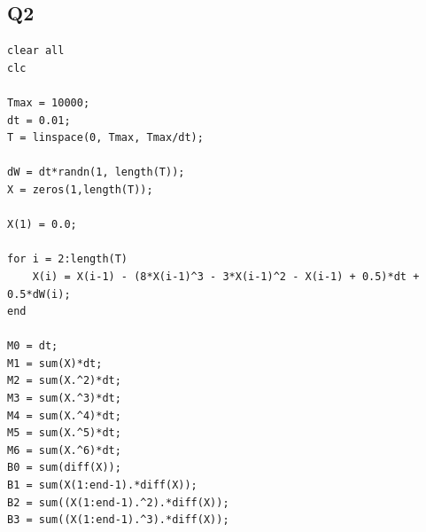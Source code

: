 \documentclass[11pt]{article} %
\begin{document}
\subsection{Q2}
\begin{verbatim}
clear all
clc

Tmax = 10000;
dt = 0.01;
T = linspace(0, Tmax, Tmax/dt);

dW = dt*randn(1, length(T));
X = zeros(1,length(T));

X(1) = 0.0;

for i = 2:length(T)
    X(i) = X(i-1) - (8*X(i-1)^3 - 3*X(i-1)^2 - X(i-1) + 0.5)*dt + 0.5*dW(i);
end

M0 = dt;
M1 = sum(X)*dt;
M2 = sum(X.^2)*dt;
M3 = sum(X.^3)*dt;
M4 = sum(X.^4)*dt;
M5 = sum(X.^5)*dt;
M6 = sum(X.^6)*dt;
B0 = sum(diff(X));
B1 = sum(X(1:end-1).*diff(X));
B2 = sum((X(1:end-1).^2).*diff(X));
B3 = sum((X(1:end-1).^3).*diff(X));


\end{verbatim}
\end{document}
